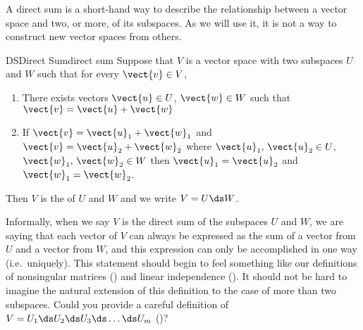 %
A direct sum is a short-hand way to describe the relationship between a vector space and two, or more, of its subspaces.  As we will use it, it is not a way to construct new vector spaces from others.
%
\begin{definition}{DS}{Direct Sum}{direct sum}
Suppose that $V$ is a vector space with two subspaces $U$ and $W$ such that 
for every $\vect{v}\in V$,
\begin{enumerate}
\item  There exists vectors $\vect{u}\in U$, $\vect{w}\in W$ such that $\vect{v}=\vect{u}+\vect{w}$
%
\item If $\vect{v}=\vect{u}_1+\vect{w}_1$ and $\vect{v}=\vect{u}_2+\vect{w}_2$ where $\vect{u}_1,\,\vect{u}_2\in U$, $\vect{w}_1,\,\vect{w}_2\in W$ then $\vect{u}_1=\vect{u}_2$ and $\vect{w}_1=\vect{w}_2$.
\end{enumerate}
Then $V$ is the  of $U$ and $W$ and we write $V=U\ds W$.
\end{definition}
%
Informally, when we say $V$ is the direct sum of the subspaces $U$ and $W$, we are saying that each vector of $V$ can always be expressed as the sum of a vector from $U$ and a vector from $W$, and this expression can only be accomplished in one way (i.e.\ uniquely).  This statement should begin to feel something like our definitions of nonsingular matrices () and linear independence ().   It should not be hard to imagine the natural extension of this definition to the case of more than two subspaces.  Could you provide a careful definition of  $V=U_1\ds U_2\ds U_3\ds \dots\ds U_m$ ()?\par
%
%
